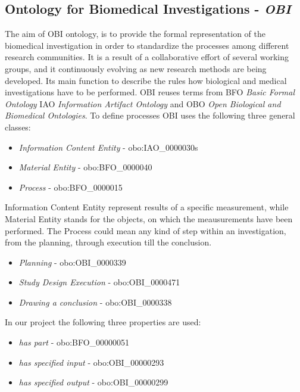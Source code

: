 \subsection{Ontology for Biomedical Investigations - \textit{OBI}} 



The aim of OBI ontology, is to provide the formal representation of the biomedical investigation in order to standardize the processes among different research communities. It is a result of a collaborative effort of several working groups, and it continuously evolving as new research methods are being developed. Its main function to describe the rules how biological and medical investigations have to be performed. OBI reuses terms from BFO \textit{Basic Formal Ontology} IAO \textit{Information Artifact Ontology} and  OBO \textit{Open Biological and Biomedical Ontologies}\cite{10.1371/journal.pone.0154556}. To define processes OBI uses the following three general classes:

\begin{itemize}
	\item  \textit{Information Content Entity} - obo:IAO\_0000030s
	\item  \textit{Material Entity} - obo:BFO\_0000040
	\item  \textit{Process} - obo:BFO\_0000015
\end{itemize}

Information Content Entity represent results of a specific measurement, while Material Entity stands for the objects, on which the meausurements have been performed. 
The Process could mean any kind of step within an investigation, from the planning, through execution till the conclusion.

\begin{itemize}
	\item  \textit{Planning} - obo:OBI\_0000339
	\item  \textit{Study Design Execution} - obo:OBI\_0000471
	\item  \textit{Drawing a conclusion} - obo:OBI\_0000338
\end{itemize}


In our project the following three properties are used:

\begin{itemize}
	\item  \textit{has part} - obo:BFO\_00000051
	\item  \textit{has specified input} - obo:OBI\_00000293
	\item  \textit{has specified output} - obo:OBI\_00000299
\end{itemize}


